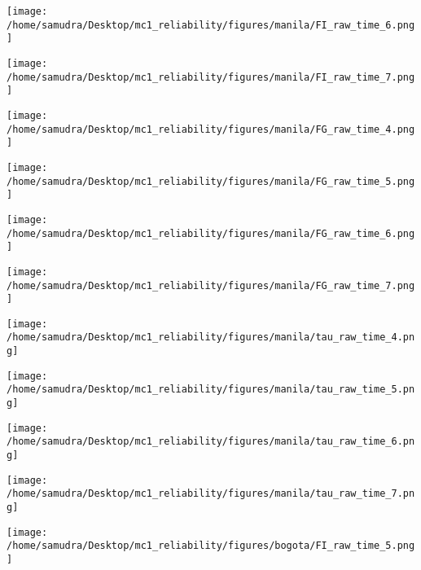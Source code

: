 \documentclass[a4paper]{article}
\def\lthtmlcheckvsize{\ifdim\ht\sizebox<\vsize 
  \ifdim\wd\sizebox<\hsize\expandafter\hfill\fi \expandafter\vfill
  \else\expandafter\vss\fi}%
\begin{document}
{\newpage\clearpage
{}%
\texttt{[image: /home/samudra/Desktop/mc1\_reliability/figures/manila/FI\_raw\_time\_6.png]}%
\lthtmlpictureZ
\lthtmlcheckvsize\clearpage}

{\newpage\clearpage
{}%
\texttt{[image: /home/samudra/Desktop/mc1\_reliability/figures/manila/FI\_raw\_time\_7.png]}%
\lthtmlpictureZ
\lthtmlcheckvsize\clearpage}

{\newpage\clearpage
{}%
\texttt{[image: /home/samudra/Desktop/mc1\_reliability/figures/manila/FG\_raw\_time\_4.png]}%
\lthtmlpictureZ
\lthtmlcheckvsize\clearpage}

{\newpage\clearpage
{}%
\texttt{[image: /home/samudra/Desktop/mc1\_reliability/figures/manila/FG\_raw\_time\_5.png]}%
\lthtmlpictureZ
\lthtmlcheckvsize\clearpage}

{\newpage\clearpage
{}%
\texttt{[image: /home/samudra/Desktop/mc1\_reliability/figures/manila/FG\_raw\_time\_6.png]}%
\lthtmlpictureZ
\lthtmlcheckvsize\clearpage}

{\newpage\clearpage
{}%
\texttt{[image: /home/samudra/Desktop/mc1\_reliability/figures/manila/FG\_raw\_time\_7.png]}%
\lthtmlpictureZ
\lthtmlcheckvsize\clearpage}

{\newpage\clearpage
{}%
\texttt{[image: /home/samudra/Desktop/mc1\_reliability/figures/manila/tau\_raw\_time\_4.png]}%
\lthtmlpictureZ
\lthtmlcheckvsize\clearpage}

{\newpage\clearpage
{}%
\texttt{[image: /home/samudra/Desktop/mc1\_reliability/figures/manila/tau\_raw\_time\_5.png]}%
\lthtmlpictureZ
\lthtmlcheckvsize\clearpage}

{\newpage\clearpage
{}%
\texttt{[image: /home/samudra/Desktop/mc1\_reliability/figures/manila/tau\_raw\_time\_6.png]}%
\lthtmlpictureZ
\lthtmlcheckvsize\clearpage}

{\newpage\clearpage
{}%
\texttt{[image: /home/samudra/Desktop/mc1\_reliability/figures/manila/tau\_raw\_time\_7.png]}%
\lthtmlpictureZ
\lthtmlcheckvsize\clearpage}

{\newpage\clearpage
{}%
\texttt{[image: /home/samudra/Desktop/mc1\_reliability/figures/bogota/FI\_raw\_time\_5.png]}%
\lthtmlpictureZ
\lthtmlcheckvsize\clearpage}
\end{document}
